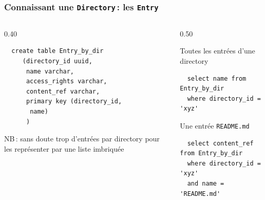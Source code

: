\begin{frame}[fragile] \frametitle{Connaissant une \texttt{Directory}\,: les \texttt{Entry}}


\begin{columns}
    \begin{column}{0.40\textwidth}
   
  \begin{verbatim}
  create table Entry_by_dir
     (directory_id uuid, 
      name varchar,
      access_rights varchar,
      content_ref varchar,
      primary key (directory_id, 
       name)
      )
  \end{verbatim}

\vfill
 NB\,: sans doute trop d'entrées par directory 
 pour les représenter par une liste imbriquée
  
   \end{column}
 \begin{column}{0.50\textwidth}
  
  Toutes les entrées d'une directory
  
  \begin{verbatim}
  select name from Entry_by_dir
  where directory_id = 'xyz'
  \end{verbatim}
  
   \vfill
   
   Une entrée \texttt{README.md}
 \begin{verbatim}
  select content_ref from Entry_by_dir
  where directory_id = 'xyz'
  and name = 'README.md'
  \end{verbatim}
 
\end{column}
\end{columns}
	
\end{frame}
	
	
	
